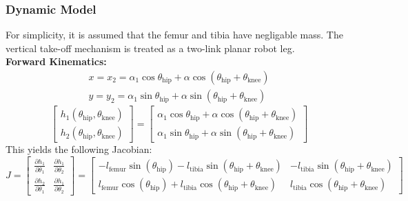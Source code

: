 \subsubsection{Dynamic Model}
\indent For simplicity, it is assumed that the femur and tibia have negligable mass. The vertical take-off mechanism is treated as a two-link planar robot leg.\\
\noindent \textbf{Forward Kinematics:}
\begin{align}
    x = x_2 = \alpha_1\cos\theta_\text{hip} + \alpha\cos(\theta_\text{hip} + \theta_\text{knee})\\
    y = y_2 = \alpha_1\sin\theta_\text{hip} + \alpha\sin(\theta_\text{hip} + \theta_\text{knee})
\end{align}
\begin{equation}
    \begin{bmatrix}
        h_1(\theta_\text{hip},\theta_\text{knee})\\
        h_2(\theta_\text{hip},\theta_\text{knee})
    \end{bmatrix}
    =
    \begin{bmatrix}
        \alpha_1\cos\theta_\text{hip} + \alpha\cos(\theta_\text{hip} + \theta_\text{knee})\\
        \alpha_1\sin\theta_\text{hip} + \alpha\sin(\theta_\text{hip} + \theta_\text{knee})
    \end{bmatrix}
\end{equation}
\noindent This yields the following Jacobian:
\begin{equation}
    J =
    \begin{bmatrix}
        \frac{\partial h_1}{\partial \theta_1} & \frac{\partial h_1}{\partial \theta_2}\\
        \frac{\partial h_2}{\partial \theta_1} & \frac{\partial h_1}{\partial \theta_2}
    \end{bmatrix}
    =
    \begin{bmatrix}
        -l_\text{femur}\sin(\theta_\text{hip}) - l_\text{tibia}\sin(\theta_\text{hip} +\theta_\text{knee}) & -l_\text{tibia}\sin(\theta_\text{hip} +\theta_\text{knee})\\
        l_\text{femur}\cos(\theta_\text{hip}) + l_\text{tibia}\cos(\theta_\text{hip} +\theta_\text{knee}) & l_\text{tibia}\cos(\theta_\text{hip} +\theta_\text{knee})
    \end{bmatrix}
\end{equation}

